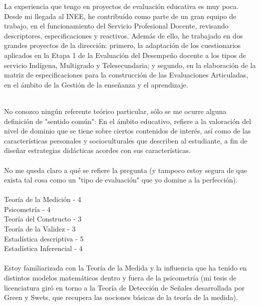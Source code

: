 \documentclass[11pt]{article}
\begin{document}
\begin{question}
{La experiencia que tengo en proyectos de evaluación educativa es muy poca. Desde mi llegada al INEE, he contribuído como parte de un gran equipo de trabajo, en el funcionamiento del Servicio Profesional Docente, revisando descriptores, especificaciones y reactivos. Además de ello, he trabajado en dos grandes proyectos de la dirección: primero, la adaptación de los cuestionarios aplicados en la Etapa 1 de la Evaluación del Desempeño docente a los tipos de servicio Indígena, Multigrado y Telesecundaria; y segundo, en la elaboración de la matriz de especificaciones para la construcción de las Evaluaciones Articuladas, en el ámbito de la Gestión de la enseñanza y el aprendizaje.\\}

\\
No conozco ningún referente teórico particular, sólo se me ocurre alguna definición de "sentido común": En el ámbito educativo, refiere a la valoración del nivel de dominio que se tiene sobre ciertos contenidos de interés, así como de las características personales y socioculturales que describen al estudiante, a fin de diseñar estrategias didácticas acordes con sus características.\\

\\
No me queda claro a qué se refiere la pregunta (y tampoco estoy segura de que exista tal cosa como un "tipo de evaluación" que yo domine a la perfección).\\

\\

Teoría de la Medición - 4\\
Psicometría - 4\\
Teoría del Constructo - 3\\
Teoría de la Validez - 3\\
Estadística descriptiva - 5\\
Estadística Inferencial - 4\\

\\
Estoy familiarizada con la Teoría de la Medida y la influencia que ha tenido en distintos modelos matemáticos dentro y fuera de la psicometría (mi tesis de licenciatura giró en torno a la Teoría de Detección de Señales desarrollada por Green y Swets, que recupera las nociones básicas de la teoría de la medida).\\


\end{question}
\end{document}
